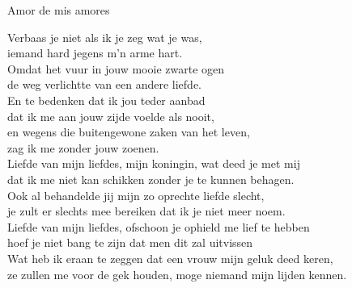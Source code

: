 \begin{song}[vals]{Amor de mis amores}
 
\begin{translation}
Verbaas je niet als ik je zeg wat je was,\\
iemand hard jegens m'n arme hart.\\
Omdat het vuur in jouw mooie zwarte ogen\\
de weg verlichtte van een andere liefde.\\
\vspace{1ex}En te bedenken dat ik jou teder aanbad\\
dat ik me aan jouw zijde voelde als nooit,\\
en wegens die buitengewone zaken van het leven,\\
zag ik me zonder jouw zoenen.\\
\vspace{1ex}Liefde van mijn liefdes, mijn koningin, wat deed je met mij\\
dat ik me niet kan schikken zonder je te kunnen behagen.\\
Ook al behandelde jij mijn zo oprechte liefde slecht,\\
je zult er slechts mee bereiken dat ik je niet meer noem.\\
Liefde van mijn liefdes, ofschoon je ophield me lief te hebben\\
hoef je niet bang te zijn dat men dit zal uitvissen\\
Wat heb ik eraan te zeggen dat een vrouw mijn geluk deed keren,\\
ze zullen me voor de gek houden, moge niemand mijn lijden kennen.
\end{translation}

\end{song}
